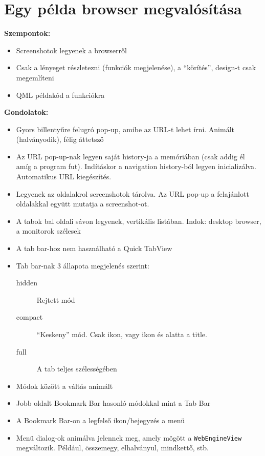 \documentclass[12pt]{report}
\begin{document}
\pagebreak


\chapter{Egy példa browser megvalósítása}
\textbf{Szempontok:}
\begin{itemize}
    \item Screenshotok legyenek a browserről
    \item Csak a lényeget részletezni (funkciók megjelenése), a ``körítés'', design-t csak
        megemlíteni
    \item QML példakód a funkciókra
\end{itemize}

\noindent
\textbf{Gondolatok:}
\begin{itemize}
    \item Gyors billentyűre felugró pop-up, amibe az URL-t lehet írni. Animált (halványodik),
        félig áttetsző
    \item Az URL pop-up-nak legyen saját history-ja a memóriában (csak addig él amíg a
        program fut). Indításkor a navigation history-ból legyen inicializálva.
        Automatikus URL kiegészítés.
    \item Legyenek az oldalakrol screenshotok tárolva. Az URL pop-up a felajánlott oldalakkal
        együtt mutatja a screenshot-ot.
    \item A tabok bal oldali sávon legyenek, vertikális listában. Indok: desktop browser,
        a monitorok szélesek
    \item A tab bar-hoz nem használható a Quick TabView
    \item Tab bar-nak 3 állapota megjelenés szerint:
        \begin{description}
            \item[hidden] Rejtett mód
            \item[compact] ``Keskeny'' mód. Csak ikon, vagy ikon és alatta a title.
            \item[full] A tab teljes szélességében
        \end{description}
    \item Módok között a váltás animált
    \item Jobb oldalt Bookmark Bar hasonló módokkal mint a Tab Bar
    \item A Bookmark Bar-on a legfelső ikon/bejegyzés a menü
    \item Menü dialog-ok animálva jelennek meg, amely mögött a \texttt{WebEngineView}
        megváltozik. Például, összemegy, elhalványul, mindkettő, stb.

\end{itemize}
\end{document}
